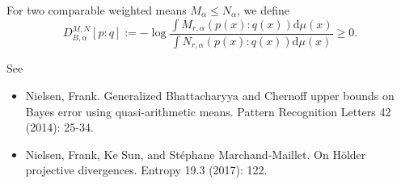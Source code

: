 \documentclass{article}
\def\dmu{\mathrm{d}\mu}
\begin{document}
For two comparable weighted means $M_\alpha\leq N_\alpha$, we define
$$
\boxed{D_{B,\alpha}^{M,N}[p:q] := -\log\frac{\int M_{r,\alpha}(p(x):q(x)) \dmu(x)}{\int N_{r,\alpha}(p(x):q(x)) \dmu(x)}\geq 0.}
$$

See
\begin{itemize}
\item Nielsen, Frank. Generalized Bhattacharyya and Chernoff upper bounds on Bayes error using quasi-arithmetic means. Pattern Recognition Letters 42 (2014): 25-34.
\item Nielsen, Frank, Ke Sun, and St\'ephane Marchand-Maillet. On H\"older projective divergences. Entropy 19.3 (2017): 122.
\end{itemize}
\end{document}
